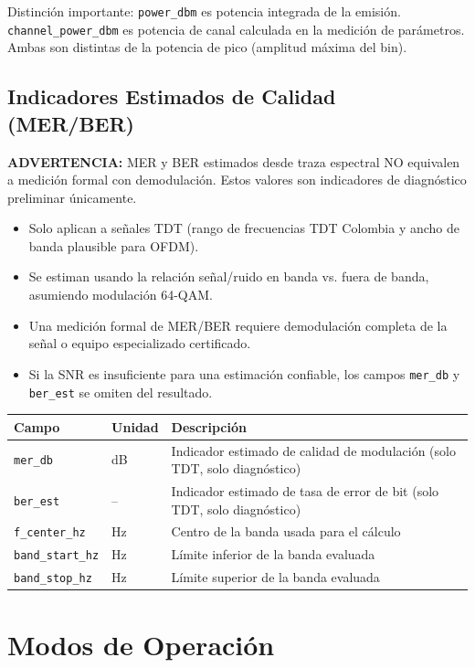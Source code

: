Distinción importante: \texttt{power\_dbm} es potencia integrada de la emisión. \texttt{channel\_power\_dbm} es potencia de canal calculada en la medición de parámetros. Ambas son distintas de la potencia de pico (amplitud máxima del bin).

\subsection{Indicadores Estimados de Calidad (MER/BER)}

\textbf{ADVERTENCIA:} MER y BER estimados desde traza espectral NO equivalen a medición formal con demodulación. Estos valores son indicadores de diagnóstico preliminar únicamente.

\begin{itemize}
\item Solo aplican a señales TDT (rango de frecuencias TDT Colombia y ancho de banda plausible para OFDM).
\item Se estiman usando la relación señal/ruido en banda vs. fuera de banda, asumiendo modulación 64-QAM.
\item Una medición formal de MER/BER requiere demodulación completa de la señal o equipo especializado certificado.
\item Si la SNR es insuficiente para una estimación confiable, los campos \texttt{mer\_db} y \texttt{ber\_est} se omiten del resultado.
\end{itemize}

\begin{tabular}{p{4cm}p{3cm}p{6cm}}
\textbf{Campo} & \textbf{Unidad} & \textbf{Descripción} \\
\hline
\texttt{mer\_db} & dB & Indicador estimado de calidad de modulación (solo TDT, solo diagnóstico) \\
\texttt{ber\_est} & -- & Indicador estimado de tasa de error de bit (solo TDT, solo diagnóstico) \\
\texttt{f\_center\_hz} & Hz & Centro de la banda usada para el cálculo \\
\texttt{band\_start\_hz} & Hz & Límite inferior de la banda evaluada \\
\texttt{band\_stop\_hz} & Hz & Límite superior de la banda evaluada \\
\end{tabular}

\section{Modos de Operación}

